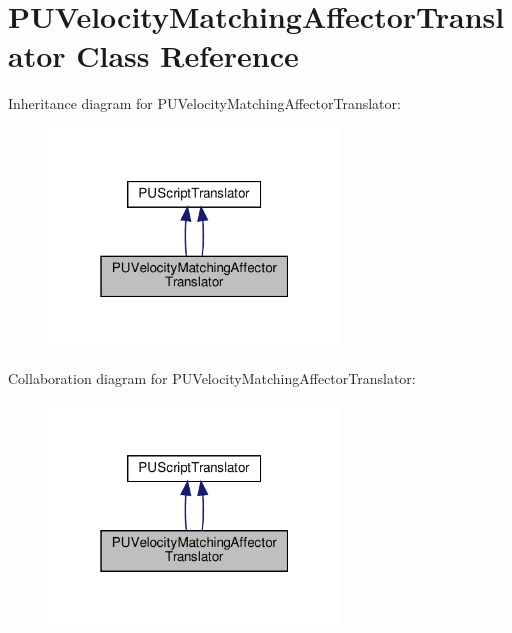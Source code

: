 \hypertarget{classPUVelocityMatchingAffectorTranslator}{}\section{P\+U\+Velocity\+Matching\+Affector\+Translator Class Reference}
\label{classPUVelocityMatchingAffectorTranslator}


Inheritance diagram for P\+U\+Velocity\+Matching\+Affector\+Translator\+:
\nopagebreak
\begin{figure}[H]
\begin{center}
\leavevmode
\includegraphics[width=220pt]{classPUVelocityMatchingAffectorTranslator__inherit__graph}
\end{center}
\end{figure}


Collaboration diagram for P\+U\+Velocity\+Matching\+Affector\+Translator\+:
\nopagebreak
\begin{figure}[H]
\begin{center}
\leavevmode
\includegraphics[width=220pt]{classPUVelocityMatchingAffectorTranslator__coll__graph}
\end{center}
\end{figure}
